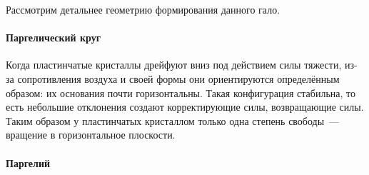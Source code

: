 Рассмотрим детальнее геометрию формирования данного гало.




\paragraph{Паргелический круг}

Когда пластинчатые кристаллы дрейфуют вниз под действием силы тяжести, из-за сопротивления воздуха и своей формы они ориентируются определённым образом: их основания почти горизонтальны. Такая конфигурация стабильна, то есть небольшие отклонения создают корректирующие силы, возвращающие силы. Таким образом у пластинчатых кристаллом только одна степень свободы~--- вращение в горизонтальное плоскости.

\paragraph{Паргелий}


